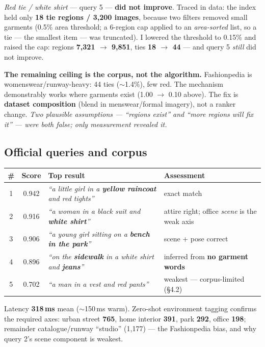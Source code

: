 \documentclass[10pt,a4paper]{article}
\begin{document}
\emph{Red tie / white shirt} --- query 5 --- \textbf{did not improve}. Traced in data: the index
held only \textbf{18 tie regions / 3{,}200 images}, because two filters removed small garments
(0.5\% area threshold; a 6-region cap applied to an \emph{area-sorted} list, so a tie --- the
smallest item --- was truncated). I lowered the threshold to 0.15\% and raised the cap: regions
\textbf{7{,}321 $\rightarrow$ 9{,}851}, ties \textbf{18 $\rightarrow$ 44} --- and query 5
\emph{still} did not improve.

\textbf{The remaining ceiling is the corpus, not the algorithm.} Fashionpedia is
womenswear/runway-heavy: 44 ties ($\sim$1.4\%), few red. The mechanism demonstrably works where
garments exist (1.00 $\rightarrow$ 0.10 above). The fix is \textbf{dataset composition} (blend in
menswear/formal imagery), not a ranker change. \emph{Two plausible assumptions --- ``regions exist''
and ``more regions will fix it'' --- were both false; only measurement revealed it.}

\subsection{Official queries and corpus}

\begin{center}\small
\begin{tabularx}{\textwidth}{@{}cc>{\raggedright\arraybackslash}p{}X@{}}
\toprule
\# & \textbf{Score} & \textbf{Top result} & \textbf{Assessment} \\
\midrule
1 & 0.942 & \emph{``a little girl in a \textbf{yellow raincoat} and red tights''} & exact match \\
2 & 0.916 & \emph{``a woman in a black suit and \textbf{white shirt}''} & attire right; office \emph{scene} is the weak axis \\
3 & 0.906 & \emph{``a young girl sitting on a \textbf{bench in the park}''} & scene + pose correct \\
4 & 0.896 & \emph{``on the \textbf{sidewalk} in a white shirt and \textbf{jeans}''} & inferred from \textbf{no garment words} \\
5 & 0.702 & \emph{``a man in a vest and red pants''} & weakest --- corpus-limited (\S4.2) \\
\bottomrule
\end{tabularx}
\end{center}

Latency \textbf{318\,ms} mean ($\sim$150\,ms warm). Zero-shot environment tagging confirms the
required axes: urban street \textbf{765}, home interior \textbf{391}, park \textbf{292}, office
\textbf{198}; remainder catalogue/runway ``studio'' (1{,}177) --- the Fashionpedia bias, and why
query 2's scene component is weakest.
\end{document}
